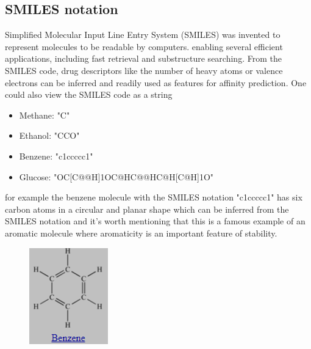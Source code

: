 \documentclass[11pt, a4paper]{article}
\begin{document}
    \subsection{SMILES notation}
    Simplified Molecular Input Line Entry System (SMILES) was invented to represent molecules to be readable by computers.
    enabling several efficient applications, including
    fast retrieval and substructure searching. From the SMILES code,
    drug descriptors like the number of heavy atoms or valence electrons
    can be inferred and readily used as features for affinity prediction.
    One could also view the SMILES code as a string
    \begin{itemize}
        \item Methane: "C"
        \item Ethanol: "CCO"
        \item Benzene: "c1ccccc1" 
        \item Glucose: "OC[C@@H]1OC@HC@@HC@H[C@H]1O"     
    \end{itemize}
    for example the benzene molecule with the SMILES notation "c1ccccc1" has six carbon atoms in a circular and planar shape which can be inferred from the SMILES notation and 
    it's worth mentioning that this is a famous example of an aromatic molecule where aromaticity is an important feature of stability.
    \begin{figure}[H]
        \centering
        \begin{minipage}{0.2\textwidth}
        \includegraphics[width=\textwidth]{Benzene.png}
        \end{minipage}   
    \end{figure}
\end{document}
